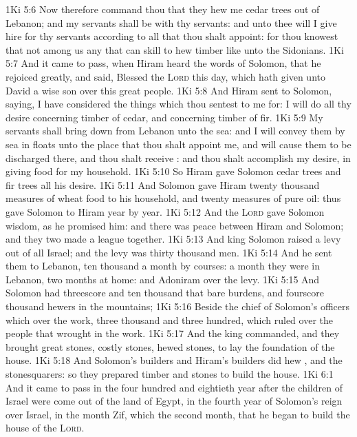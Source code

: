 \vs 1Ki 5:6 Now therefore command thou that they hew me cedar trees out of Lebanon; and my servants shall be with thy servants: and unto thee will I give hire for thy servants according to all that thou shalt appoint: for thou knowest that  not among us any that can skill to hew timber like unto the Sidonians.
\vs 1Ki 5:7 And it came to pass, when Hiram heard the words of Solomon, that he rejoiced greatly, and said, Blessed  the \textsc{Lord} this day, which hath given unto David a wise son over this great people.
\vs 1Ki 5:8 And Hiram sent to Solomon, saying, I have considered the things which thou sentest to me for:  I will do all thy desire concerning timber of cedar, and concerning timber of fir.
\vs 1Ki 5:9 My servants shall bring  down from Lebanon unto the sea: and I will convey them by sea in floats unto the place that thou shalt appoint me, and will cause them to be discharged there, and thou shalt receive : and thou shalt accomplish my desire, in giving food for my household.
\vs 1Ki 5:10 So Hiram gave Solomon cedar trees and fir trees  all his desire.
\vs 1Ki 5:11 And Solomon gave Hiram twenty thousand measures of wheat  food to his household, and twenty measures of pure oil: thus gave Solomon to Hiram year by year.
\vs 1Ki 5:12 And the \textsc{Lord} gave Solomon wisdom, as he promised him: and there was peace between Hiram and Solomon; and they two made a league together.
\vs 1Ki 5:13 And king Solomon raised a levy out of all Israel; and the levy was thirty thousand men.
\vs 1Ki 5:14 And he sent them to Lebanon, ten thousand a month by courses: a month they were in Lebanon,  two months at home: and Adoniram  over the levy.
\vs 1Ki 5:15 And Solomon had threescore and ten thousand that bare burdens, and fourscore thousand hewers in the mountains;
\vs 1Ki 5:16 Beside the chief of Solomon's officers which  over the work, three thousand and three hundred, which ruled over the people that wrought in the work.
\vs 1Ki 5:17 And the king commanded, and they brought great stones, costly stones,  hewed stones, to lay the foundation of the house.
\vs 1Ki 5:18 And Solomon's builders and Hiram's builders did hew , and the stonesquarers: so they prepared timber and stones to build the house.
\vs 1Ki 6:1 And it came to pass in the four hundred and eightieth year after the children of Israel were come out of the land of Egypt, in the fourth year of Solomon's reign over Israel, in the month Zif, which  the second month, that he began to build the house of the \textsc{Lord}.
